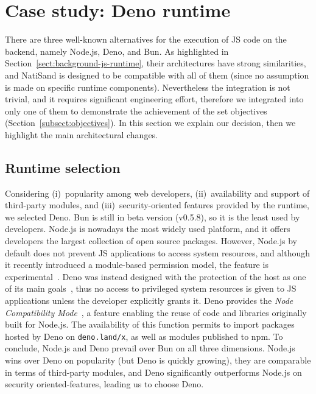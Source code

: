 \section{Case study: Deno runtime}
\label{sect:case-study-deno}

There are three well-known alternatives for the execution of JS code
on the backend, namely Node.js, Deno, and Bun. As highlighted in
Section~\ref{sect:background-js-runtime}, their architectures have
strong similarities, and NatiSand is designed to be compatible with
all of them (since no assumption is made on specific runtime
components). Nevertheless the integration is not trivial, and it requires
significant engineering effort, therefore we integrated \pap into only
one of them to demonstrate the achievement of the set objectives
(Section~\ref{subsect:objectives}). In this section we explain our
decision, then we highlight the main architectural changes.

\subsection{Runtime selection}
\label{sect:deno-selection}

Considering (i)~popularity among web developers, (ii)~availability and
support of third-party modules, and (iii)~security-oriented features
provided by the runtime, we selected Deno. Bun is still in beta
version (v0.5.8), so it is the least used by developers.
Node.js is nowadays the most
widely used platform, and it offers developers the largest collection
of open source packages. However, Node.js by default does not prevent
JS applications to access system resources, and although it
recently introduced a module-based permission model, the feature is
experimental~\cite{node-permissions}. Deno was instead designed with the protection of
the host as one of its main goals~\cite{nodejs-regret}, thus no access to privileged system
resources is given to JS applications unless the developer
explicitly grants it. Deno provides the
{\em Node Compatibility Mode}~\cite{deno-compatibility-mode}, a
feature enabling the reuse of
code and libraries originally built for Node.js. The availability of
this function permits to
import packages hosted by Deno on {\tt deno.land/x}, as well as
modules published to npm. To conclude, Node.js and Deno prevail
over Bun on all three dimensions. Node.js wins over Deno on
popularity (but Deno is quickly growing), they are comparable in terms
of third-party modules, and Deno significantly outperforms Node.js on
security oriented-features, leading us to choose Deno.

